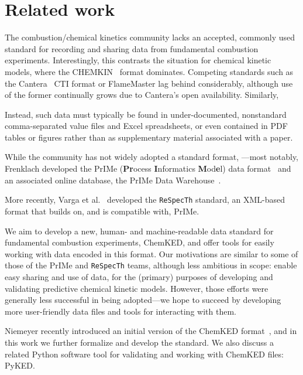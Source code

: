 \documentclass[12pt]{ussci}
\newcommand\ck{ChemKED}
\newcommand\pk{PyKED}
\begin{document}
\section{Related work}
%

The combustion\slash chemical kinetics community lacks an accepted, commonly used
standard for recording and sharing data from fundamental combustion experiments.
Interestingly, this contrasts the situation for chemical kinetic models, where the
CHEMKIN~\autocite{Kee:1996ck} format dominates. Competing standards such as the
Cantera~\autocite{Cantera:2.3.0} CTI format or FlameMaster lag behind considerably, although
use of the former continually grows due to Cantera's open availability.
Similarly,

Instead, such data must typically be found in under-documented, nonstandard comma-separated value
files and Excel spreadsheets, or even contained in PDF tables or figures rather than as
supplementary material associated with a paper.

While the community has not widely adopted a standard format,
---most notably, Frenklach developed the PrIMe (\textbf{Pr}ocess \textbf{I}nformatics
\textbf{M}od\textbf{e}l) data format~\autocite{Frenklach:2007bm,You:2011hy} and an associated
online database, the PrIMe Data Warehouse~\autocite{PrIMe}.

More recently, Varga et al.~\autocite{Varga2015a,Varga2015b} developed the \texttt{ReSpecTh} standard,
an XML-based format that builds on, and is compatible with, PrIMe.

We aim to develop a new, human- and machine-readable data standard for fundamental combustion
experiments, \ck{}, and offer tools for easily working with data encoded in this format.
Our motivations are similar to some of those of the PrIMe and \texttt{ReSpecTh} teams, although
less ambitious in scope: enable easy sharing and use of data, for the (primary) purposes of
developing and validating predictive chemical kinetic models.
However, those efforts were generally less successful in being adopted---we hope to succeed
by developing more user-friendly data files and tools for interacting with them.

Niemeyer recently introduced an initial version of the \ck{} format~\autocite{Niemeyer:2016wf},
and in this work we further formalize and develop the standard. We also discuss a related
Python software tool for validating and working with \ck{} files: \pk{}.
\end{document}

